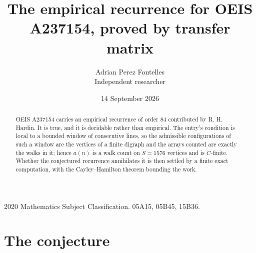 \documentclass[11pt,a4paper]{article}
\title{The empirical recurrence for OEIS A237154, proved by transfer matrix}
\author{Adrian Perez Fontelles\\ \small Independent researcher}
\date{14 September 2026}
\theoremstyle{plain}
\theoremstyle{definition}
\begin{document}
\maketitle

\begin{abstract}
OEIS A237154 carries an empirical recurrence of order $84$ contributed by R. H. Hardin. It is
true, and it is decidable rather than empirical. The entry's condition is local to a bounded window of consecutive lines, so
the admissible configurations of such a window are the vertices of a finite digraph and the
arrays counted are exactly the walks in it; hence $a(n)$ is a walk count on $S=1576$ vertices
and is $C$-finite. Whether the conjectured recurrence annihilates it is then settled by a
finite exact computation, with the Cayley--Hamilton theorem bounding the work.
\end{abstract}

\noindent\small 2020 Mathematics Subject Classification. 05A15, 05B45, 15B36.\normalsize

\section{The conjecture}
\end{document}
